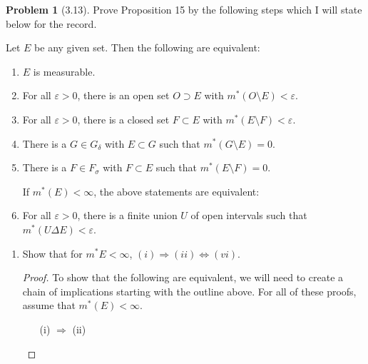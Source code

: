 \documentclass[12pt]{article}
\renewcommand{\epsilon}{\varepsilon}
\theoremstyle{definition}
\newtheorem{problem}{Problem}
\begin{document}
\begin{problem}[3.13]

    Prove Proposition 15 by the following steps which I will state below for the record.


    Let \( E \) be any given set. Then the following are equivalent:
        \begin{enumerate}[label = (\roman{*})]
            \item \( E \) is measurable.
            \item For all \( \epsilon > 0 \), there is an open set \( O \supset E \) with \( m^{*}(O \setminus E) < \epsilon \).
            \item For all \( \epsilon > 0 \), there is a closed set \( F \subset E \) with \( m^{*}(E \setminus F) < \epsilon \).
            \item There is a \( G \in G_{\delta} \) with \( E \subset G \) such that \( m^{*}(G \setminus E) = 0 \). 
            \item There is a \( F \in F_{\sigma} \) with \( F \subset E \) such that \( m^{*}(E \setminus F) = 0 \). 
            
            \noindent If \( m^{*}(E) < \infty \), the above statements are equivalent:

            \item For all \( \epsilon > 0 \), there is a finite union \( U \) of open intervals such that \( m^{*}(U \Delta E) < \epsilon \).

        \end{enumerate}

        \begin{enumerate}[label = \alph{*}.]
            \item Show that for \( m^{*} E < \infty \), \( (i) \Rightarrow (ii) \Leftrightarrow (vi) \).
            \begin{proof}
                To show that the following are equivalent, we will need to create a chain of implications starting with the outline above. For all of these proofs, assume that \( m^{*}(E) < \infty \).

                \begin{enumerate}
                    \item[(i)  \( \Rightarrow \) (ii)] 


\end{enumerate}
\end{proof}
\end{enumerate}
\end{problem}
\end{document}
